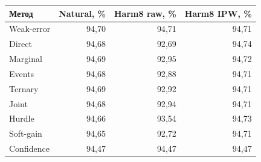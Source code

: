 \begin{tabular}{lrrr}
\toprule
Метод & Natural, \% & Harm8 raw, \% & Harm8 IPW, \% \\
\midrule
Weak-error & 94{,}70 & 94{,}71 & 94{,}71 \\
Direct & 94{,}68 & 92{,}69 & 94{,}74 \\
Marginal & 94{,}69 & 92{,}95 & 94{,}72 \\
Events & 94{,}68 & 92{,}88 & 94{,}71 \\
Ternary & 94{,}69 & 92{,}92 & 94{,}71 \\
Joint & 94{,}68 & 92{,}94 & 94{,}71 \\
Hurdle & 94{,}66 & 93{,}54 & 94{,}73 \\
Soft-gain & 94{,}65 & 92{,}72 & 94{,}71 \\
Confidence & 94{,}47 & 94{,}47 & 94{,}47 \\
\bottomrule
\end{tabular}
